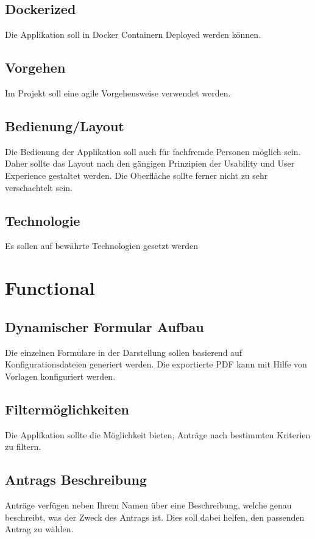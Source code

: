 \subsection{Dockerized}\label{subsec:dockerized}
Die Applikation soll in Docker Containern Deployed werden können.
\subsection{Vorgehen}\label{subsec:vorgehen}
Im Projekt soll eine agile Vorgehensweise verwendet werden.
\subsection{Bedienung/Layout}\label{subsec:bedienung/layout}
Die Bedienung der Applikation soll auch für fachfremde Personen möglich sein.
Daher sollte das Layout nach den gängigen Prinzipien der Usability und User Experience gestaltet werden.
Die Oberfläche sollte ferner nicht zu sehr verschachtelt sein.
\subsection{Technologie}\label{subsec:technologie}
Es sollen auf bewährte Technologien gesetzt werden

\section{Functional}\label{sec:functional}
\subsection{Dynamischer Formular Aufbau}\label{subsec:dynamischer-formular-aufbau}
Die einzelnen Formulare in der Darstellung sollen basierend auf Konfigurationsdateien generiert werden.
Die exportierte PDF kann mit Hilfe von Vorlagen konfiguriert werden.
\subsection{Filtermöglichkeiten}\label{subsec:filtermoglichkeiten}
Die Applikation sollte die Möglichkeit bieten, Anträge nach bestimmten Kriterien zu filtern.
\subsection{Antrags Beschreibung}\label{subsec:antrags-beschreibung}
Anträge verfügen neben Ihrem Namen über eine Beschreibung, welche genau beschreibt, was der Zweck des Antrags ist.
Dies soll dabei helfen, den passenden Antrag zu wählen.
